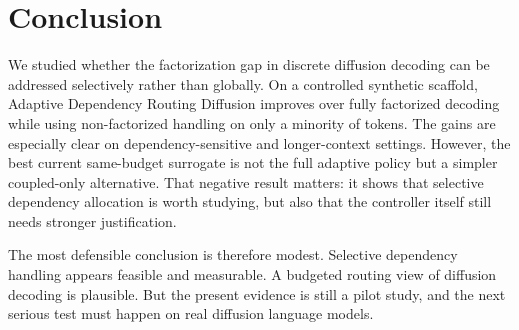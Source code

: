\section{Conclusion}

We studied whether the factorization gap in discrete diffusion decoding can be addressed selectively rather than globally. On a controlled synthetic scaffold, Adaptive Dependency Routing Diffusion improves over fully factorized decoding while using non-factorized handling on only a minority of tokens. The gains are especially clear on dependency-sensitive and longer-context settings. However, the best current same-budget surrogate is not the full adaptive policy but a simpler coupled-only alternative. That negative result matters: it shows that selective dependency allocation is worth studying, but also that the controller itself still needs stronger justification.

The most defensible conclusion is therefore modest. Selective dependency handling appears feasible and measurable. A budgeted routing view of diffusion decoding is plausible. But the present evidence is still a pilot study, and the next serious test must happen on real diffusion language models.
